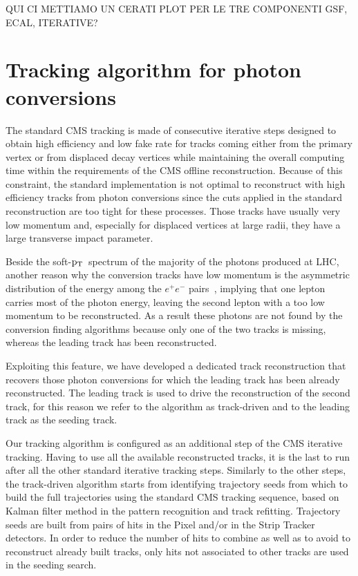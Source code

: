 \documentclass[a4paper]{jpconf}
\def \pt{$\p_{\rm T}$~}
\begin{document}
QUI CI METTIAMO UN CERATI PLOT PER LE TRE COMPONENTI GSF, ECAL, ITERATIVE?


\section{Tracking algorithm for photon conversions}
\label{sec:newSeedingStep}
 

The standard CMS tracking is made of consecutive iterative steps designed to obtain high efficiency and low fake rate for
tracks coming either from the primary vertex or from displaced decay
vertices while maintaining the overall computing time within the
requirements of the CMS offline reconstruction.
Because of this constraint, the standard implementation is not optimal
to reconstruct with high efficiency tracks from photon conversions
since the cuts applied in the standard
reconstruction are too tight for these processes. Those
tracks have usually very low momentum and, especially for displaced
vertices at large radii, they have a large transverse impact parameter.

Beside the soft-\pt spectrum of the majority of the photons produced at LHC, another reason why the conversion tracks have low momentum is the asymmetric distribution of the energy among the $e^+e^-$ pairs~\cite{pdg}, implying that one lepton carries most of the photon energy, leaving the second lepton with a too low momentum to be reconstructed. As a result these photons are not found by the conversion finding algorithms because only one of the two tracks is missing, whereas the leading track has been reconstructed.

Exploiting this feature, we have developed a dedicated track reconstruction that recovers those photon conversions for which the 
leading  track has been already reconstructed. The leading track is used to drive the reconstruction of the second track, for this reason we refer to the algorithm as track-driven and to the leading track as the seeding track.

Our tracking algorithm is configured as an additional step of the CMS iterative tracking. Having to use all the available reconstructed tracks, it is the last to run after all the other standard iterative tracking steps.
%
Similarly to  the other steps, the track-driven algorithm starts from identifying trajectory seeds from which to build the full trajectories using the standard CMS tracking sequence, based on Kalman filter method in the pattern recognition and track refitting.
Trajectory seeds are built from pairs of hits
in the Pixel and/or in the Strip Tracker detectors. 
In order to reduce the number of hits to combine as well as to avoid to reconstruct already built tracks,  only hits not associated to other tracks are used in the seeding search.
\end{document}
